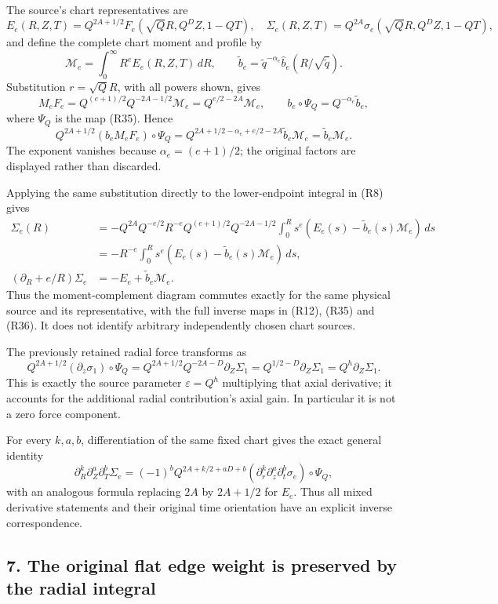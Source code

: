 \documentclass[10pt,a4paper]{article}
\begin{document}
The source's chart representatives are \[
E_e(R,Z,T)=Q^{2A+1/2}F_e(\sqrt QR,Q^DZ,1-QT),\quad
\Sigma_e(R,Z,T)=Q^{2A}\sigma_e(\sqrt QR,Q^DZ,1-QT),
\tag{R36}
\] and define the complete chart moment and profile by \[
\mathcal M_e=\int_0^\infty R^eE_e(R,Z,T)\,dR,\qquad
\widetilde b_e=\widetilde q^{-\alpha_e}\widehat b_e(R/\sqrt{\widetilde q}).
\tag{R37}
\] Substitution \(r=\sqrt QR\), with all powers shown, gives \[
M_eF_e=Q^{(e+1)/2}Q^{-2A-1/2}\mathcal M_e
=Q^{e/2-2A}\mathcal M_e,
\qquad b_e\circ\Psi_Q=Q^{-\alpha_e}\widetilde b_e,
\tag{R38}
\] where \(\Psi_Q\) is the map (R35). Hence \[
Q^{2A+1/2}(b_eM_eF_e)\circ\Psi_Q
=Q^{2A+1/2-\alpha_e+e/2-2A}\widetilde b_e\mathcal M_e
=\widetilde b_e\mathcal M_e.
\tag{R39}
\] The exponent vanishes because \(\alpha_e=(e+1)/2\); the original factors are displayed rather than discarded.

Applying the same substitution directly to the lower-endpoint integral in (R8) gives \[
\begin{aligned}
\Sigma_e(R)&=-Q^{2A}Q^{-e/2}R^{-e}
Q^{(e+1)/2}Q^{-2A-1/2}
\int_0^R s^e(E_e(s)-\widetilde b_e(s)\mathcal M_e)\,ds\\
&=-R^{-e}\int_0^R s^e(E_e(s)-\widetilde b_e(s)\mathcal M_e)\,ds,\\
(\partial_R+e/R)\Sigma_e&=-E_e+\widetilde b_e\mathcal M_e.
\end{aligned}
\tag{R40}
\] Thus the moment-complement diagram commutes exactly for the same physical source and its representative, with the full inverse maps in (R12), (R35) and (R36). It does not identify arbitrary independently chosen chart sources.

The previously retained radial force transforms as \[
Q^{2A+1/2}(\partial_z\sigma_1)\circ\Psi_Q
=Q^{2A+1/2}Q^{-2A-D}\partial_Z\Sigma_1
=Q^{1/2-D}\partial_Z\Sigma_1
=Q^h\partial_Z\Sigma_1.
\tag{R41}
\] This is exactly the source parameter \(\varepsilon=Q^h\) multiplying that axial derivative; it accounts for the additional radial contribution's axial gain. In particular it is not a zero force component.

For every \(k,a,b\), differentiation of the same fixed chart gives the exact general identity \[
\partial_R^k\partial_Z^a\partial_T^b\Sigma_e
=(-1)^bQ^{2A+k/2+aD+b}
(\partial_r^k\partial_z^a\partial_t^b\sigma_e)\circ\Psi_Q,
\tag{R42}
\] with an analogous formula replacing \(2A\) by \(2A+1/2\) for \(E_e\). Thus all mixed derivative statements and their original time orientation have an explicit inverse correspondence.

\subsection{7. The original flat edge weight is preserved by the radial integral}\label{nsupstream:radial_stress_reconstruction_audit:the-original-flat-edge-weight-is-preserved-by-the-radial-integral}
\end{document}
